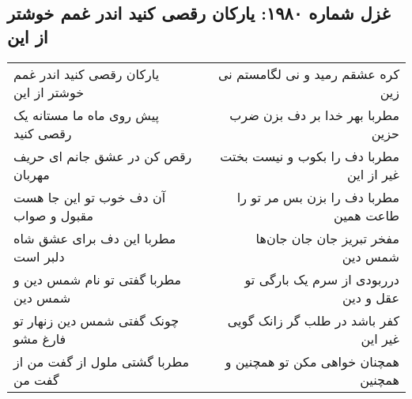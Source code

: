 \begin{center}
\section*{غزل شماره ۱۹۸۰: یارکان رقصی کنید اندر غمم خوشتر از این}
\label{sec:1980}
\begin{longtable}{l p{0.5cm} r}
یارکان رقصی کنید اندر غمم خوشتر از این
&&
کره عشقم رمید و نی لگامستم نی زین
\\
پیش روی ماه ما مستانه یک رقصی کنید
&&
مطربا بهر خدا بر دف بزن ضرب حزین
\\
رقص کن در عشق جانم ای حریف مهربان
&&
مطربا دف را بکوب و نیست بختت غیر از این
\\
آن دف خوب تو این جا هست مقبول و صواب
&&
مطربا دف را بزن بس مر تو را طاعت همین
\\
مطربا این دف برای عشق شاه دلبر است
&&
مفخر تبریز جان جان جان‌ها شمس دین
\\
مطربا گفتی تو نام شمس دین و شمس دین
&&
درربودی از سرم یک بارگی تو عقل و دین
\\
چونک گفتی شمس دین زنهار تو فارغ مشو
&&
کفر باشد در طلب گر زانک گویی غیر این
\\
مطربا گشتی ملول از گفت من از گفت من
&&
همچنان خواهی مکن تو همچنین و همچنین
\\
\end{longtable}
\end{center}
